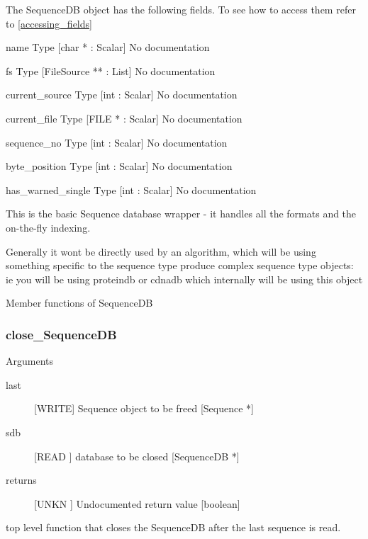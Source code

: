 The SequenceDB object has the following fields. To see how to access them refer to \ref{accessing_fields}
\begin{description}
\item{name} Type [char * : Scalar] No documentation

\item{fs} Type [FileSource ** : List] No documentation

\item{current_source} Type [int : Scalar] No documentation

\item{current_file} Type [FILE * : Scalar] No documentation

\item{sequence_no} Type [int : Scalar] No documentation

\item{byte_position} Type [int : Scalar] No documentation

\item{has_warned_single} Type [int : Scalar] No documentation

\end{description}
This is the basic Sequence database
wrapper - it handles all the formats
and the on-the-fly indexing.


Generally it wont be directly used by
an algorithm, which will be using something
specific to the sequence type produce complex 
sequence type objects: ie you will be using
proteindb or cdnadb which internally
will be using this object




Member functions of SequenceDB

\subsubsection{close_SequenceDB}

Arguments
\begin{description}
\item[last] [WRITE] Sequence object to be freed  [Sequence *]
\item[sdb] [READ ] database to be closed [SequenceDB *]
\item[returns] [UNKN ] Undocumented return value [boolean]
\end{description}
top level function that closes the SequenceDB
after the last sequence is read.


